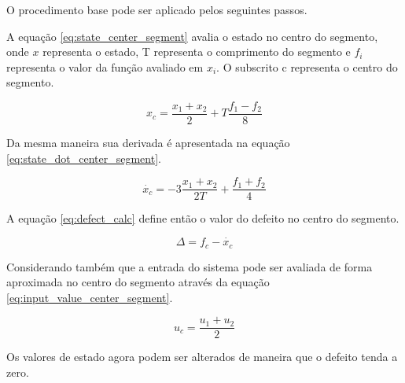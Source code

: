 O procedimento base pode ser aplicado pelos seguintes passos.

A equação \ref{eq:state_center_segment} avalia o estado no centro do segmento, onde $x$ representa o estado, T representa o comprimento do segmento e $f_i$ representa o valor da função avaliado em $x_i$. O subscrito c representa o centro do segmento.

\begin{equation}
    \label{eq:state_center_segment}
    x_c = \frac{x_{1} + x_{2}}{2} + T\frac{f_{1} - f_{2}}{8}
\end{equation}

Da mesma maneira sua derivada é apresentada na equação \ref{eq:state_dot_center_segment}.

\begin{equation}
    \label{eq:state_dot_center_segment}
    \dot{x_{c}} = -3\frac{x_{1} + x_{2}}{2T} + \frac{f_{1} + f_{2}}{4}
\end{equation}

A equação \ref{eq:defect_calc} define então o valor do defeito no centro do segmento.

\begin{equation}
    \label{eq:defect_calc}
    \Delta = f_c - \dot{x_c}
\end{equation}

Considerando também que a entrada do sistema pode ser avaliada de forma aproximada no centro do segmento através da equação \ref{eq:input_value_center_segment}.

\begin{equation}
    \label{eq:input_value_center_segment}
    u_c = \frac{u_1 + u_2}{2}
\end{equation}

Os valores de estado agora podem ser alterados de maneira que o defeito tenda a zero.